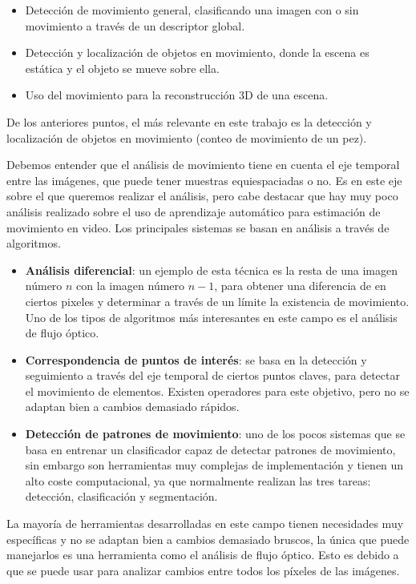 \begin{itemize}
    \item Detección de movimiento general, clasificando una imagen con o sin movimiento a través de un descriptor global.
    \item Detección y localización de objetos en movimiento, donde la escena es estática y el objeto se mueve sobre ella.
    \item Uso del movimiento para la reconstrucción 3D de una escena.
\end{itemize}

De los anteriores puntos, el más relevante en este trabajo es la detección y localización de objetos en movimiento (conteo de movimiento de un pez).

Debemos entender que el análisis de movimiento tiene en cuenta el eje temporal entre las imágenes, que puede tener muestras equiespaciadas o no. Es en este eje sobre el que queremos realizar el análisis, pero 
cabe destacar que hay muy poco análisis realizado sobre el uso de aprendizaje automático para estimación de movimiento en video. Los principales sistemas se basan en análisis a través de algoritmos.

\begin{itemize}
    \item \textbf{Análisis diferencial}: un ejemplo de esta técnica es la resta de una imagen número $n$ con la imagen número $n-1$, para obtener una diferencia de en ciertos pixeles y determinar a través de un límite 
    la existencia de movimiento. Uno de los tipos de algoritmos más interesantes en este campo es el análisis de flujo óptico.
    \item \textbf{Correspondencia de puntos de interés}: se basa en la detección y seguimiento a través del eje temporal de ciertos puntos claves, para detectar el movimiento de elementos. Existen operadores para este 
    objetivo, pero no se adaptan bien a cambios demasiado rápidos.
    \item \textbf{Detección de patrones de movimiento}: uno de los pocos sistemas que se basa en entrenar un clasificador capaz de detectar patrones de movimiento, sin embargo son herramientas muy complejas 
    de implementación y tienen un alto coste computacional, ya que normalmente realizan las tres tareas: detección, clasificación y segmentación.
\end{itemize}

La mayoría de herramientas desarrolladas en este campo tienen necesidades muy específicas y no se adaptan bien a cambios demasiado bruscos, la única que puede manejarlos es una herramienta como el análisis de flujo óptico. 
Esto es debido a que se puede usar para analizar cambios entre todos los píxeles de las imágenes.

